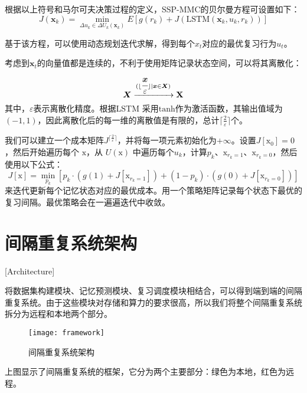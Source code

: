 根据以上符号和马尔可夫决策过程的定义，SSP-MMC的贝尔曼方程可设置如下：
\begin{equation}
J(\boldsymbol x_k) = \min\limits_{\Delta u_k \in \Delta U_k(\boldsymbol x_k)} E[g(r_k) + J(\mathrm{LSTM}(\boldsymbol x_k,u_k,r_k))]
\end{equation}

基于该方程，可以使用动态规划迭代求解，得到每个$x_t$对应的最优复习行为$u_t$。

考虑到$\boldsymbol x_t$的向量值都是连续的，不利于使用矩阵记录状态空间，可以将其离散化：
\begin{equation}
\boldsymbol X \xrightarrow[]{(\lfloor \cfrac{\boldsymbol x}{\varepsilon} \rfloor|\boldsymbol x \in \boldsymbol X)} \boldsymbol{\mathrm{X}}
\end{equation}
其中，$\varepsilon$表示离散化精度。根据LSTM 采用$\mathrm{tanh}$作为激活函数，其输出值域为$(-1,1)$，因此离散化后的每一维的离散值是有限的，总计$\lceil\frac{2}{\varepsilon}\rceil$个。

我们可以建立一个成本矩阵$J^{\lceil\frac{2}{\varepsilon}\rceil}$，并将每一项元素初始化为$+\infty$。设置$J[\boldsymbol{\mathrm{x_0}}] = 0$，然后开始遍历每个 $\boldsymbol{\mathrm{x}}$，从 $U(\boldsymbol{\mathrm{x}})$ 中遍历每个$u_k$，计算$p_k$、$\boldsymbol{\mathrm{x}}_{r_k=1}$、$\boldsymbol{\mathrm{x}}_{r_k=0}$，然后使用以下公式：
\begin{equation}
J[\boldsymbol{\mathrm{x}}] = \min\limits_{p_k} [p_k \cdot (g(1) + J[\boldsymbol{\mathrm{x}}_{r_k=1}]) + (1-p_k) \cdot (g(0) + J[\boldsymbol{\mathrm{x}}_{r_k=0}])]
\end{equation}
来迭代更新每个记忆状态对应的最优成本。用一个策略矩阵记录每个状态下最优的复习间隔。最优策略会在一遍遍迭代中收敛。

\section{间隔重复系统架构}[Architecture]

将数据集构建模块、记忆预测模块、复习调度模块相结合，可以得到端到端的间隔重复系统。由于这些模块对存储和算力的要求很高，所以我们将整个间隔重复系统拆分为远程和本地两个部分。

\begin{figure}[htpb]
\centering
\texttt{[image: framework]}
\caption{间隔重复系统架构}
\end{figure}

上图显示了间隔重复系统的框架，它分为两个主要部分：绿色为本地，红色为远程。


